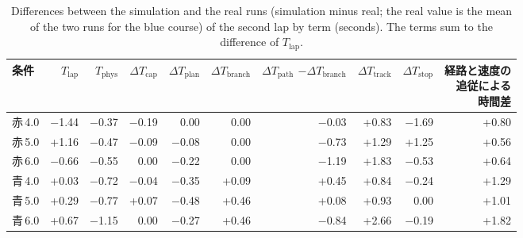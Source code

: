 \begin{table}[!htbp]
  \centering
  \caption[Differences between the simulation and the real runs by term.]{Differences between the simulation and the real runs (simulation minus real; the real value is the mean of the two runs for the blue course) of the second lap by term (seconds). The terms sum to the difference of $T_{\mathrm{lap}}$.}
  \label{tab:sim_diff}
  \footnotesize
  \begin{lrbox}{\tblbox}\setlength{\tabcolsep}{3pt}\begin{tabular}{lrrrrrrrrr}
    \toprule
    条件 & $T_{\mathrm{lap}}$ & $T_{\mathrm{phys}}$ & $\Delta T_{\mathrm{cap}}$ & $\Delta T_{\mathrm{plan}}$ & $\Delta T_{\mathrm{branch}}$ & \shortstack[r]{$\Delta T_{\mathrm{path}}$\\$-\Delta T_{\mathrm{branch}}$} & $\Delta T_{\mathrm{track}}$ & $\Delta T_{\mathrm{stop}}$ & \shortstack[r]{経路と速度の\\追従による\\時間差} \\
    \midrule
    赤\,4.0 & $-$1.44 & $-$0.37 & $-$0.19 & 0.00 & 0.00 & $-$0.03 & +0.83 & $-$1.69 & +0.80 \\
    赤\,5.0 & +1.16 & $-$0.47 & $-$0.09 & $-$0.08 & 0.00 & $-$0.73 & +1.29 & +1.25 & +0.56 \\
    赤\,6.0 & $-$0.66 & $-$0.55 & 0.00 & $-$0.22 & 0.00 & $-$1.19 & +1.83 & $-$0.53 & +0.64 \\
    \addlinespace[3pt]
    青\,4.0 & +0.03 & $-$0.72 & $-$0.04 & $-$0.35 & +0.09 & +0.45 & +0.84 & $-$0.24 & +1.29 \\
    青\,5.0 & +0.29 & $-$0.77 & +0.07 & $-$0.48 & +0.46 & +0.08 & +0.93 & 0.00 & +1.01 \\
    青\,6.0 & +0.67 & $-$1.15 & 0.00 & $-$0.27 & +0.46 & $-$0.84 & +2.66 & $-$0.19 & +1.82 \\
    \bottomrule
  \end{tabular}\end{lrbox}\usebox{\tblbox}
\end{table}

